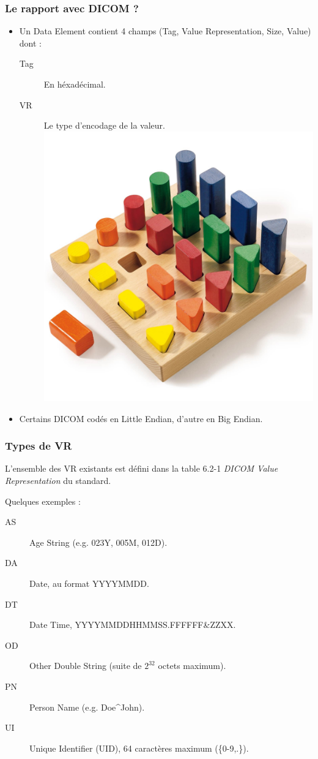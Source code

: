 \frame
{
    \frametitle{Le rapport avec DICOM ?}
    \begin{itemize}
        \item Un Data Element contient 4 champs (Tag, Value Representation, Size, Value) dont :
        \begin{description}
            \item[Tag] En h\'exad\'ecimal.
            \item[VR] Le type d'encodage de la valeur.\\
                \includegraphics[width=.5\linewidth]{./figures/types.jpg}
        \end{description}
        \item Certains DICOM cod\'es en Little Endian, d'autre en Big Endian. 
    \end{itemize}
}

\frame
{
    \frametitle{Types de VR}
    L'ensemble des VR existants est d\'efini dans la table 6.2-1 \emph{DICOM Value Representation} du standard.

    Quelques exemples :
    \begin{description}
        \item[AS] Age String (e.g. 023Y, 005M, 012D).
        \item[DA] Date, au format YYYYMMDD.
        \item[DT] Date Time, YYYYMMDDHHMMSS.FFFFFF\&{}ZZXX.
        \item[OD] Other Double String (suite de $2^{32}$ octets maximum).
        \item[PN] Person Name (e.g. Doe\^{}John).
        \item[UI] Unique Identifier (UID), 64 caract\`eres maximum (\{0-9,.\}).
    \end{description}
}

